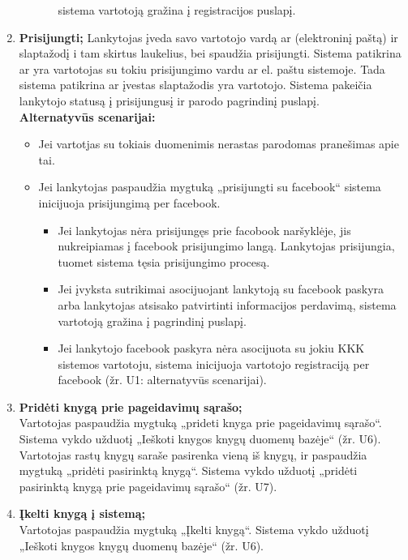 \documentclass{VUMIFPSkursinis}
\begin{document}
\begin{enumerate}[label=\textbf{U\arabic*.}]
\begin{itemize}
\begin{itemize}
								sistema vartotoją gražina į registracijos puslapį.
						\end{itemize}
				\end{itemize}
			\item \textbf{Prisijungti;}
				Lankytojas įveda savo vartotojo vardą ar (elektroninį paštą) ir slaptažodį i tam skirtus laukelius, bei spaudžia prisijungti.
				Sistema patikrina ar yra vartotojas su tokiu prisijungimo vardu ar el. paštu sistemoje. 
				Tada sistema patikrina ar įvestas slaptažodis yra vartotojo. Sistema pakeičia lankytojo statusą į prisijungusį ir parodo pagrindinį puslapį.\\
				\textbf{Alternatyvūs scenarijai:}
				\begin{itemize}
					\item Jei vartotjas su tokiais duomenimis nerastas parodomas pranešimas apie tai.
					\item Jei lankytojas paspaudžia mygtuką „prisijungti su facebook“ sistema inicijuoja prisijungimą per facebook.
						\begin{itemize}
							\item Jei lankytojas nėra prisijungęs prie facobook naršyklėje, jis nukreipiamas į facebook prisijungimo langą. 
								Lankytojas prisijungia, tuomet sistema tęsia prisijungimo procesą.
							\item Jei įvyksta sutrikimai asocijuojant lankytoją su facebook paskyra arba lankytojas atsisako patvirtinti informacijos perdavimą,
								sistema vartotoją gražina į pagrindinį puslapį.
							\item Jei lankytojo facebook paskyra nėra asocijuota su jokiu KKK sistemos vartotoju, sistema inicijuoja vartotojo registraciją per facebook (žr. U1: alternatyvūs scenarijai).
						\end{itemize}
				\end{itemize}
			\item \textbf{Pridėti knygą prie pageidavimų sąrašo;} \\
				Vartotojas paspaudžia mygtuką „prideti knyga prie pageidavimų sąrašo“. 
				Sistema vykdo užduotį „Ieškoti knygos knygų duomenų bazėje“ (žr. U6).
				Vartotojas rastų knygų saraše pasirenka vieną iš knygų, ir paspaudžia mygtuką „pridėti pasirinktą knygą“.
				Sistema vykdo užduotį „pridėti pasirinktą knygą prie pageidavimų sąrašo“ (žr. U7).
			\item \textbf{Įkelti knygą į sistemą;}\\
				Vartotojas paspaudžia mygtuką „Įkelti knygą“. Sistema vykdo užduotį „Ieškoti knygos knygų duomenų bazėje“ (žr. U6).

\end{enumerate}
\end{document}
